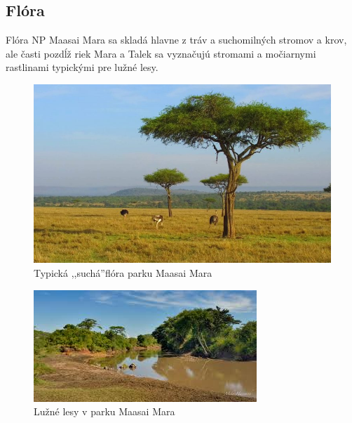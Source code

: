 \documentclass{article}
\begin{document}
\subsection{Flóra}
Flóra NP Maasai Mara sa skladá hlavne z tráv a suchomilných stromov a krov, ale časti pozdĺž riek Mara a Talek sa vyznačujú stromami a močiarnymi rastlinami typickými pre lužné lesy.

\begin{figure}[h]
\includegraphics[scale=0.3]{datlovnik.jpg}
\caption{Typická ,,suchá''flóra parku Maasai Mara}
\end{figure}
\begin{figure}[h]
\includegraphics[scale=1.0]{riverine.jpeg}
\caption{Lužné lesy v parku Maasai Mara}
\end{figure}
\newpage
\end{document}
